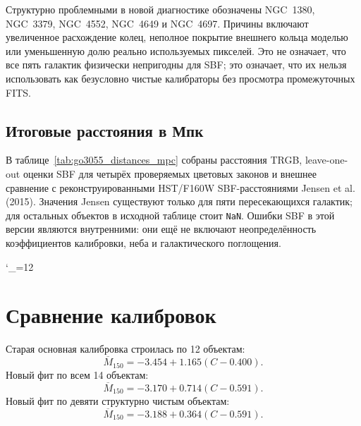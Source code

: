 \documentclass[12pt,a4paper]{article}
\begin{document}
Структурно проблемными в новой диагностике обозначены
NGC~1380, NGC~3379, NGC~4552, NGC~4649 и NGC~4697.
Причины включают увеличенное расхождение колец, неполное
покрытие внешнего кольца моделью или уменьшенную долю
реально используемых пикселей. Это не означает, что все пять
галактик физически непригодны для SBF; это означает, что их
нельзя использовать как безусловно чистые калибраторы без
просмотра промежуточных FITS.

\subsection{Итоговые расстояния в Мпк}

В таблице~\ref{tab:go3055_distances_mpc} собраны расстояния
TRGB, leave-one-out оценки SBF для четырёх проверяемых
цветовых законов и внешнее сравнение с реконструированными
HST/F160W SBF-расстояниями Jensen et al. (2015). Значения
Jensen существуют только для пяти пересекающихся галактик;
для остальных объектов в исходной таблице стоит
\texttt{NaN}. Ошибки SBF в этой версии являются внутренними:
они ещё не включают неопределённость коэффициентов
калибровки, неба и галактического поглощения.

\begin{landscape}
\begin{table}[p]
\centering
\caption{Расстояния до галактик GO-3055 в Мпк. Для SBF
показаны leave-one-out результаты постоянной, линейной,
квадратичной и ломаной цветовых моделей.}
\label{tab:go3055_distances_mpc}
\begingroup
\catcode`\_=12
\resizebox{\linewidth}{!}{%
%
}
\endgroup
\end{table}
\end{landscape}

\section{Сравнение калибровок}

Старая основная калибровка строилась по 12 объектам:
\begin{equation}
    \overline M_{150}
    = -3.454
    +1.165\left(C-0.400\right).
\end{equation}
Новый фит по всем 14 объектам:
\begin{equation}
    \overline M_{150}
    = -3.170
    +0.714\left(C-0.591\right).
\end{equation}
Новый фит по девяти структурно чистым объектам:
\begin{equation}
    \overline M_{150}
    = -3.188
    +0.364\left(C-0.591\right).
\end{equation}
\end{document}
